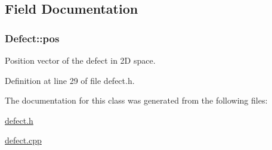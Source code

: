 \subsection{Field Documentation}
\hypertarget{classDefect_aed2731c1beefc22e3db6ad5b18194cdd}{
\subsubsection[{pos}]{ Defect\-::pos\hspace{0.3cm}{\ttfamily [protected]}}}\label{d5/d4f/classDefect_aed2731c1beefc22e3db6ad5b18194cdd}


Position vector of the defect in 2\-D space. 



Definition at line 29 of file defect.\-h.



The documentation for this class was generated from the following files\-:\begin{DoxyCompactItemize}
\item 
\hyperlink{defect_8h}{defect.\-h}\item 
\hyperlink{defect_8cpp}{defect.\-cpp}\end{DoxyCompactItemize}
